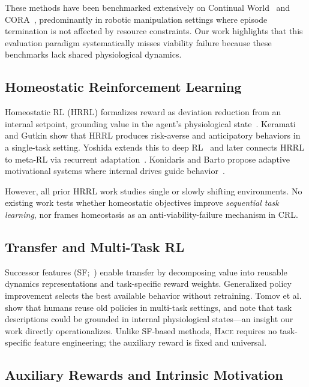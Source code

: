 \documentclass{article}
\newcommand{\hace}{\textsc{Hace}}
\begin{document}
These methods have been benchmarked extensively on Continual
World~\citep{continualworld2021} and CORA~\citep{cora2022}, predominantly
in robotic manipulation settings where episode termination is not
affected by resource constraints. Our work highlights that this evaluation
paradigm systematically misses viability failure because these benchmarks
lack shared physiological dynamics.

\subsection{Homeostatic Reinforcement Learning}

Homeostatic RL (HRRL) formalizes reward as deviation reduction from an
internal setpoint, grounding value in the agent's physiological
state~\citep{keramati2014}. Keramati and Gutkin show that HRRL produces
risk-averse and anticipatory behaviors in a single-task setting. Yoshida
extends this to deep RL~\citep{yoshida2018} and later connects HRRL to
meta-RL via recurrent adaptation~\citep{Yoshida}. Konidaris and Barto
propose adaptive motivational systems where internal drives guide
behavior~\citep{konidaris2006}.

However, all prior HRRL work studies single or slowly shifting
environments. No existing work tests whether homeostatic objectives
improve \emph{sequential task learning}, nor frames homeostasis as
an anti-viability-failure mechanism in CRL.

\subsection{Transfer and Multi-Task RL}

Successor features (SF;~\citep{Barreto}) enable transfer by decomposing
value into reusable dynamics representations and task-specific reward
weights. Generalized policy improvement selects the best available
behavior without retraining. Tomov et al.~\citep{Tomov} show that humans
reuse old policies in multi-task settings, and note that task descriptions
could be grounded in internal physiological states---an insight our work
directly operationalizes. Unlike SF-based methods, \hace{} requires no
task-specific feature engineering; the auxiliary reward is fixed and
universal.

\subsection{Auxiliary Rewards and Intrinsic Motivation}
\end{document}
